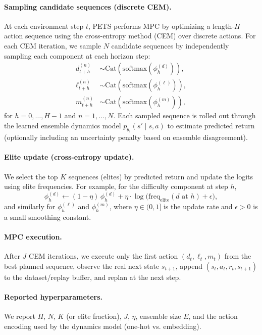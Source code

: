 \documentclass[preprint,12pt]{elsarticle}
\newcommand{\Cat}{\mathrm{Cat}}
\newcommand{\softmax}{\mathrm{softmax}}
\begin{document}
\begin{frontmatter}
\paragraph{Sampling candidate sequences (discrete CEM).}
At each environment step $t$, PETS performs MPC by optimizing a length-$H$ action sequence using the cross-entropy method (CEM) over discrete actions. For each CEM iteration, we sample $N$ candidate sequences by independently sampling each component at each horizon step:
\begin{align}
d^{(n)}_{t+h} &\sim \Cat\!\left(\softmax\!\left(\phi^{(d)}_{h}\right)\right), \nonumber\\
\ell^{(n)}_{t+h} &\sim \Cat\!\left(\softmax\!\left(\phi^{(\ell)}_{h}\right)\right), \nonumber\\
m^{(n)}_{t+h} &\sim \Cat\!\left(\softmax\!\left(\phi^{(m)}_{h}\right)\right),
\label{eq:pets_sampling}
\end{align}
for $h=0,\dots,H-1$ and $n=1,\dots,N$. Each sampled sequence is rolled out through the learned ensemble dynamics model
$p_{\theta_i}(s' \mid s,a)$ to estimate predicted return (optionally including an uncertainty penalty based on ensemble disagreement).

\paragraph{Elite update (cross-entropy update).}
We select the top $K$ sequences (elites) by predicted return and update the logits using elite frequencies. For example, for the difficulty component at step $h$,
\begin{equation}
\phi^{(d)}_h \leftarrow (1-\eta)\,\phi^{(d)}_h + \eta \cdot \log\!\Big(\mathrm{freq}_{\mathrm{elite}}(d \text{ at } h) + \epsilon\Big),
\label{eq:pets_update}
\end{equation}
and similarly for $\phi^{(\ell)}_h$ and $\phi^{(m)}_h$, where $\eta \in (0,1]$ is the update rate and $\epsilon>0$ is a small smoothing constant.

\paragraph{MPC execution.}
After $J$ CEM iterations, we execute only the first action $(d_t,\ell_t,m_t)$ from the best planned sequence, observe the real next state $s_{t+1}$, append $(s_t,a_t,r_t,s_{t+1})$ to the dataset/replay buffer, and replan at the next step.

\paragraph{Reported hyperparameters.}
We report $H$, $N$, $K$ (or elite fraction), $J$, $\eta$, ensemble size $E$, and the action encoding used by the dynamics model (one-hot vs. embedding).


\end{frontmatter}
\end{document}
